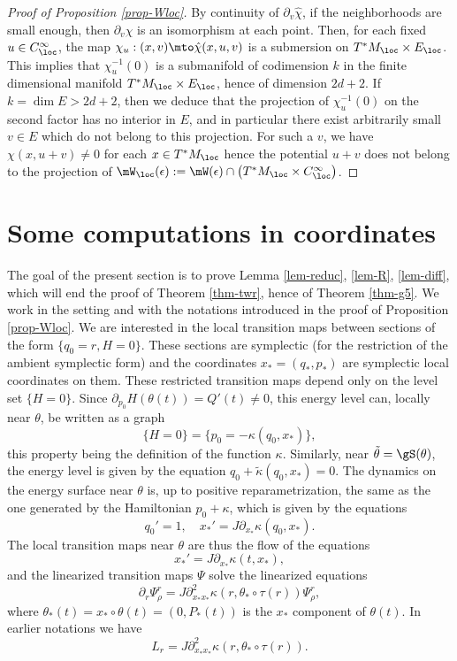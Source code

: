 \begin{proof}[Proof of Proposition \ref{prop-Wloc}]
By continuity of $\partial_v \hat \chi$, if the neighborhoods are small enough, then $\partial_v\hat \chi$ is an isomorphism at each point.
Then, for each fixed $u\in C^{\infty}_{\loc}$, the map
$\chi_u:(x,v)\mto \hat \chi (x,u,v)$ is a submersion on $T^*M_{\loc}\times E_{\loc}$.
This implies that $\chi_u^{-1}(0)$ is a submanifold of codimension $k$ in the finite dimensional manifold
$T^*M_{\loc}\times E_{\loc}$, hence of dimension $2d+2$. If $k=\dim E>2d+2$, then we deduce that the projection of $\chi_u^{-1}(0)$
on the second factor has no interior in $E$, and in particular there exist arbitrarily small $v\in E$ which do not belong to this projection.
For such a $v$, we have $\chi(x,u+v)\neq 0$ for each $x\in T^*M_{\loc}$ hence the potential $u+v$ does not belong to the projection of
$\mW_{\loc}(\epsilon):= \mW(\epsilon)\cap \big(T^*M_{\loc}\times C^{\infty}_{\loc}\big)$.
\end{proof}

\section{Some computations in coordinates}
The goal of the present section is to prove Lemma \ref{lem-reduc}, \ref{lem-R}, \ref{lem-diff}, which will end the proof of
Theorem \ref{thm-twr}, hence of Theorem \ref{thm-g5}.
We work in the setting and with the notations introduced in the proof of Proposition \ref{prop-Wloc}.
We are interested in the local transition maps between sections of the form $\{q_0=r, H=0\}$. These sections are symplectic (for the restriction
of the ambient symplectic form) and the coordinates $x_*=(q_*,p_*)$ are symplectic local coordinates on them.
These restricted transition maps depend only on the level set $\{H=0\}$. Since $\partial_{p_0} H(\theta(t))=Q'(t)\neq 0$, this energy level can, locally near $\theta$, be written as a graph
\[
\{H=0\}=\{p_0=-\kappa(q_0,x_*)\},
\]
this property being the definition of the function $\kappa$. Similarly, near $\tilde \theta= \gS(\theta)$, the energy level is given by the equation $q_0+\tilde \kappa(q_0, x_*)=0$.
The dynamics on the energy surface near $\theta$ is, up to positive reparametrization, the same as the one generated by the Hamiltonian $p_0+\kappa$, which is given by the equations
\[
q_0'=1, \quad
x_*'=J\partial_{x_*} \kappa (q_0, x_*).
\]
The local transition maps near $\theta$ are thus the flow of the equations
\[
x_*'=J\partial_{x_*}\kappa (t, x_*),
\]
and the linearized transition maps $\Psi$ solve the linearized equations
\[
\partial_r \Psi_{\rho}^r = J\partial^2_{x_*x_*} \kappa (r,\theta_*\circ \tau(r))\Psi_{\rho}^r,
\]
where $\theta_*(t)=x_*\circ \theta(t)= (0, P_*(t))$ is the $x_*$ component of $\theta(t)$. In earlier notations we have
\[
L_r= J\partial^2_{x_*x_*} \kappa (r, \theta_*\circ \tau(r)).
\]

